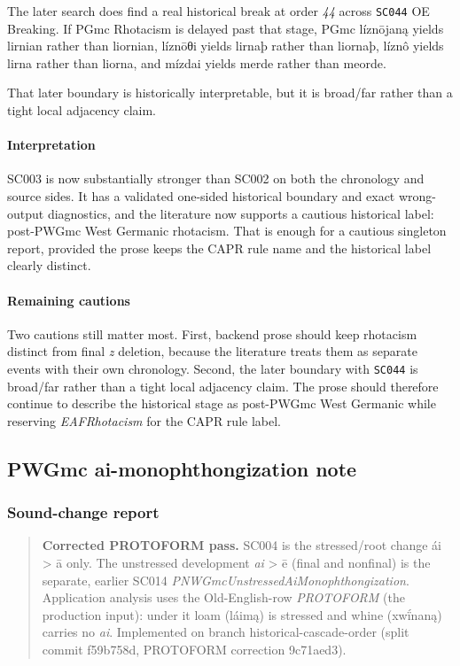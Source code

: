 \documentclass[
  british,
  a4paper,
]{article}
\begin{document}
The later search does find a real historical break at order \emph{44}
across \texttt{SC044} OE Breaking. If PGmc Rhotacism is delayed past
that stage, PGmc líznōjaną yields lirnian rather than liornian, líznōθi
yields lirnaþ rather than liornaþ, líznô yields lirna rather than
liorna, and mízdai yields merde rather than meorde.

That later boundary is historically interpretable, but it is broad/far
rather than a tight local adjacency claim.

\paragraph{Interpretation}\label{interpretation}

SC003 is now substantially stronger than SC002 on both the chronology
and source sides. It has a validated one-sided historical boundary and
exact wrong-output diagnostics, and the literature now supports a
cautious historical label: post-PWGmc West Germanic rhotacism. That is
enough for a cautious singleton report, provided the prose keeps the
CAPR rule name and the historical label clearly distinct.

\paragraph{Remaining cautions}\label{remaining-cautions}

Two cautions still matter most. First, backend prose should keep
rhotacism distinct from final \emph{z} deletion, because the literature
treats them as separate events with their own chronology. Second, the
later boundary with \texttt{SC044} is broad/far rather than a tight
local adjacency claim. The prose should therefore continue to describe
the historical stage as post-PWGmc West Germanic while reserving
\emph{EAFRhotacism} for the CAPR rule label.

\subsection{PWGmc ai-monophthongization
note}\label{pwgmc-ai-monophthongization-note}

\subsubsection{Sound-change report}\label{sound-change-report-1}

\begin{quote}
\textbf{Corrected PROTOFORM pass.} SC004 is the stressed/root change ái
\textgreater{} ā only. The unstressed development \emph{ai}
\textgreater{} ē (final and nonfinal) is the separate, earlier SC014
\emph{PNWGmcUnstressedAiMonophthongization}. Application analysis uses
the Old-English-row \emph{PROTOFORM} (the production input): under it
loam (láimą) is stressed and whine (xwḯnaną) carries no \emph{ai}.
Implemented on branch historical-cascade-order (split commit f59b758d,
PROTOFORM correction 9c71aed3).
\end{quote}
\end{document}
